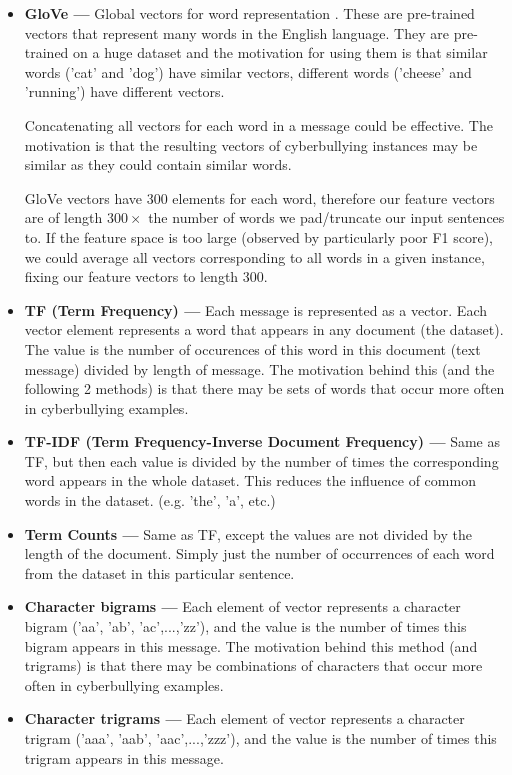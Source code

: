 \documentclass[12pt,a4paper]{article}
\begin{document}
\begin{itemize}
	\item \textbf{GloVe --- } Global vectors for word representation \cite{glove}. These are pre-trained vectors that represent many words in the English language. They are pre-trained on a huge dataset and the motivation for using them is that similar words ('cat' and 'dog') have similar vectors, different words ('cheese' and 'running') have different vectors. 
	
	Concatenating all vectors for each word in a message could be effective. The motivation is that the resulting vectors of cyberbullying instances may be similar as they could contain similar words. 
	
	GloVe vectors have 300 elements for each word, therefore our feature vectors are of length $300 \times$ the number of words we pad/truncate our input sentences to. If the feature space is too large (observed by particularly poor F1 score), we could average all vectors corresponding to all words in a given instance, fixing our feature vectors to length 300. 
	
	\item \textbf{TF (Term Frequency) --- } Each message is represented as a vector. Each vector element represents a word that appears in any document (the dataset). The value is the number of occurences of this word in this document (text message) divided by length of message. The motivation behind this (and the following 2 methods) is that there may be sets of words that occur more often in cyberbullying examples.
	
	\item \textbf{TF-IDF (Term Frequency-Inverse Document Frequency) --- } Same as TF, but then each value is divided by the number of times the corresponding word appears in the whole dataset. This reduces the influence of common words in the dataset. (e.g. 'the', 'a', etc.)
	
	\item \textbf{Term Counts --- } Same as TF, except the values are not divided by the length of the document. Simply just the number of occurrences of each word from the dataset in this particular sentence.
	
	\item \textbf{Character bigrams --- } Each element of vector represents a character bigram ('aa', 'ab', 'ac',...,'zz'), and the value is the number of times this bigram appears in this message. The motivation behind this method (and trigrams) is that there may be combinations of characters that occur more often in cyberbullying examples.
	
	\item \textbf{Character trigrams --- } Each element of vector represents a character trigram ('aaa', 'aab', 'aac',...,'zzz'), and the value is the number of times this trigram appears in this message.
\end{itemize}
\end{document}
